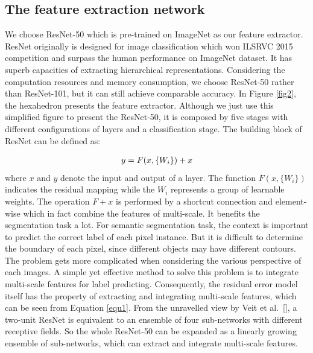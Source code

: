 \documentclass[10.5pt,compsoc]{TsT}
\theoremstyle{mystyle}
\begin{document}
{\subsection{The feature extraction network}
\label{s:feature}
\noindent

We choose ResNet-50 which is pre-trained on ImageNet as our feature extractor. ResNet originally is designed for image classification which won ILSRVC 2015 competition and surpass the human performance on ImageNet dataset. It has superb capacities of extracting hierarchical representations. Considering the computation resources and memory consumption, we choose ResNet-50 rather than ResNet-101, but it can still achieve comparable accuracy. In Figure \ref{fig2}, the hexahedron presents the feature extractor. Although we just use this simplified figure to present the ResNet-50, it is composed by five stages with different configurations of layers and a classification stage. The building block of ResNet can be defined as:

\begin{equation}\label{equ1}
\setlength\abovedisplayskip{4pt}
\setlength\belowdisplayskip{4pt}
\begin{split}
y = F(x, \{W_{i}\}) + x \\
\end{split}
\end{equation} 
where $x$ and $y$ denote the input and output of a layer. The function $F(x, \{W_{i}\})$ indicates the residual mapping while the $W_{i}$ represents a group of learnable weights. The operation $F + x$ is performed by a shortcut connection and element-wise which in fact combine the features of multi-scale. It benefits the segmentation task a lot. For semantic segmentation task,  the context is important to predict the correct label of each pixel instance. But it is difficult to determine the boundary of each pixel, since different objects may have different contours. The problem gets more complicated when considering the various perspective of each images. A simple yet effective method to solve this problem is to integrate multi-scale features for label predicting. Consequently, the residual error model itself has the property of extracting and integrating multi-scale features, which can be seen from Equation \ref {equ1}. From the unravelled view by Veit et al.~\ref{}, a two-unit ResNet is equivalent to an ensemble of four sub-networks with different receptive fields. So the whole ResNet-50 can be expanded as a linearly growing ensemble of sub-networks, which can extract and integrate multi-scale features.

}
\end{document}
